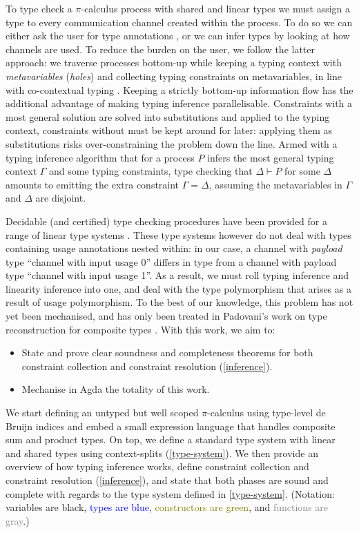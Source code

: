 \documentclass[sigplan,screen,review]{acmart}
\theoremstyle{definition}\newtheorem{mytheorem}{Theorem}[section]
\newcommand{\picalc}{$\pi$-calculus}
\begin{document}
To type check a \picalc{} process with shared and linear types we must assign a type to every communication channel created within the process.
To do so we can either ask the user for type annotations \cite{ZalakainD21}, or we can infer types by looking at how channels are used.
To reduce the burden on the user, we follow the latter approach: we traverse processes bottom-up while keeping a typing context with \emph{metavariables} (\emph{holes}) and collecting typing constraints on metavariables, in line with co-contextual typing \cite{ErdwegBKKM15}.
Keeping a strictly bottom-up information flow has the additional advantage of making typing inference parallelisable.
Constraints with a most general solution are solved into substitutions and applied to the typing context, constraints without must be kept around for later: applying them as substitutions risks over-constraining the problem down the line.
Armed with a typing inference algorithm that for a process $P$ infers the most general typing context $\Gamma$ and some typing constraints, type checking that $\Delta \vdash P$ for some $\Delta$ amounts to emitting the extra constraint $\Gamma = \Delta$, assuming the metavariables in $\Gamma$ and $\Delta$ are disjoint.

Decidable (and certified) type checking procedures have been provided for a range of linear type systems \cite{Allais15,Allais17,OrchardLE19,Brady21}.
These type systems however do not deal with types containing usage annotations nested within: in our case, a channel with \emph{payload} type ``channel with input usage 0'' differs in type from a channel with payload type ``channel with input usage 1''.
As a result, we must roll typing inference and linearity inference into one, and deal with the type polymorphism that arises as a result of usage polymorphism.
To the best of our knowledge, this problem has not yet been mechanised, and has only been treated in Padovani's work on type reconstruction for composite types \cite{Padovani15}.
With this work, we aim to:
\begin{itemize}
  \item State and prove clear soundness and completeness theorems for both constraint collection and constraint resolution (\autoref{inference}).
  \item Mechanise in Agda the totality of this work.
\end{itemize}

We start defining an untyped but well scoped \picalc{} using type-level de Bruijn indices \cite{deBruijn72} and embed a small expression language that handles composite sum and product types.
On top, we define a standard type system with linear and shared types using context-splits (\autoref{type-system}).
We then provide an overview of how typing inference works, define constraint collection and constraint resolution (\autoref{inference}), and state that both phases are sound and complete with regards to the type system defined in \autoref{type-system}.
(Notation: variables are black, \textcolor{blue}{types are blue}, \textcolor{olive}{constructors are green}, and \textcolor{gray}{functions are gray}.)
\end{document}
